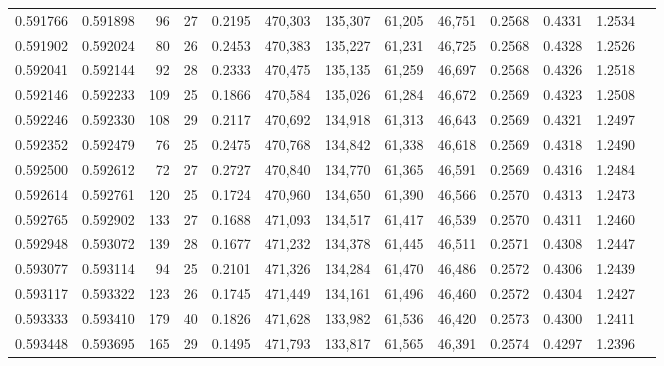 \begin{tabular}{rrrrrrrrrrrrr}
0.591766 & 0.591898 &     96 &    27 &                                     0.2195 & 470,303 & 135,307 &  61,205 &  46,751 & 0.2568 & 0.4331 & 1.2534 \\
0.591902 & 0.592024 &     80 &    26 &                                     0.2453 & 470,383 & 135,227 &  61,231 &  46,725 & 0.2568 & 0.4328 & 1.2526 \\
0.592041 & 0.592144 &     92 &    28 &                                     0.2333 & 470,475 & 135,135 &  61,259 &  46,697 & 0.2568 & 0.4326 & 1.2518 \\
0.592146 & 0.592233 &    109 &    25 &                                     0.1866 & 470,584 & 135,026 &  61,284 &  46,672 & 0.2569 & 0.4323 & 1.2508 \\
0.592246 & 0.592330 &    108 &    29 &                                     0.2117 & 470,692 & 134,918 &  61,313 &  46,643 & 0.2569 & 0.4321 & 1.2497 \\
0.592352 & 0.592479 &     76 &    25 &                                     0.2475 & 470,768 & 134,842 &  61,338 &  46,618 & 0.2569 & 0.4318 & 1.2490 \\
0.592500 & 0.592612 &     72 &    27 &                                     0.2727 & 470,840 & 134,770 &  61,365 &  46,591 & 0.2569 & 0.4316 & 1.2484 \\
0.592614 & 0.592761 &    120 &    25 &                                     0.1724 & 470,960 & 134,650 &  61,390 &  46,566 & 0.2570 & 0.4313 & 1.2473 \\
0.592765 & 0.592902 &    133 &    27 &                                     0.1688 & 471,093 & 134,517 &  61,417 &  46,539 & 0.2570 & 0.4311 & 1.2460 \\
0.592948 & 0.593072 &    139 &    28 &                                     0.1677 & 471,232 & 134,378 &  61,445 &  46,511 & 0.2571 & 0.4308 & 1.2447 \\
0.593077 & 0.593114 &     94 &    25 &                                     0.2101 & 471,326 & 134,284 &  61,470 &  46,486 & 0.2572 & 0.4306 & 1.2439 \\
0.593117 & 0.593322 &    123 &    26 &                                     0.1745 & 471,449 & 134,161 &  61,496 &  46,460 & 0.2572 & 0.4304 & 1.2427 \\
0.593333 & 0.593410 &    179 &    40 &                                     0.1826 & 471,628 & 133,982 &  61,536 &  46,420 & 0.2573 & 0.4300 & 1.2411 \\
0.593448 & 0.593695 &    165 &    29 &                                     0.1495 & 471,793 & 133,817 &  61,565 &  46,391 & 0.2574 & 0.4297 & 1.2396 \\

\end{tabular}
